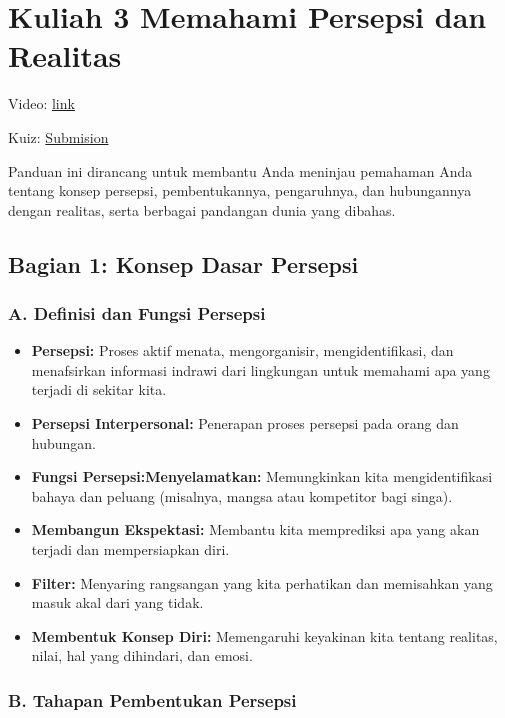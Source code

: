 \documentclass[
  letterpaper,
  DIV=11,
  numbers=noendperiod]{scrreprt}
\providecommand{\tightlist}{%
  \setlength{\itemsep}{0pt}\setlength{\parskip}{0pt}}
\begin{document}
\chapter{Kuliah 3 Memahami Persepsi dan
Realitas}\label{kuliah-3-memahami-persepsi-dan-realitas}

Video:
\href{https://youtube.com/playlist?list=PL_m-BplfO92HziIHJuNhhlF-2hOaFumHf&si=n0Zku45PZsSaYGYU}{link}

Kuiz: \href{https://forms.office.com/r/HPKrDLU2DN}{Submision}

Panduan ini dirancang untuk membantu Anda meninjau pemahaman Anda
tentang konsep persepsi, pembentukannya, pengaruhnya, dan hubungannya
dengan realitas, serta berbagai pandangan dunia yang dibahas.

\section{Bagian 1: Konsep Dasar
Persepsi}\label{bagian-1-konsep-dasar-persepsi}

\subsection{A. Definisi dan Fungsi
Persepsi}\label{a.-definisi-dan-fungsi-persepsi}

\begin{itemize}
\tightlist
\item
  \textbf{Persepsi:} Proses aktif menata, mengorganisir,
  mengidentifikasi, dan menafsirkan informasi indrawi dari lingkungan
  untuk memahami apa yang terjadi di sekitar kita.
\item
  \textbf{Persepsi Interpersonal:} Penerapan proses persepsi pada orang
  dan hubungan.
\item
  \textbf{Fungsi Persepsi:Menyelamatkan:} Memungkinkan kita
  mengidentifikasi bahaya dan peluang (misalnya, mangsa atau kompetitor
  bagi singa).
\item
  \textbf{Membangun Ekspektasi:} Membantu kita memprediksi apa yang akan
  terjadi dan mempersiapkan diri.
\item
  \textbf{Filter:} Menyaring rangsangan yang kita perhatikan dan
  memisahkan yang masuk akal dari yang tidak.
\item
  \textbf{Membentuk Konsep Diri:} Memengaruhi keyakinan kita tentang
  realitas, nilai, hal yang dihindari, dan emosi.
\end{itemize}

\subsection{B. Tahapan Pembentukan
Persepsi}\label{b.-tahapan-pembentukan-persepsi}
\end{document}

